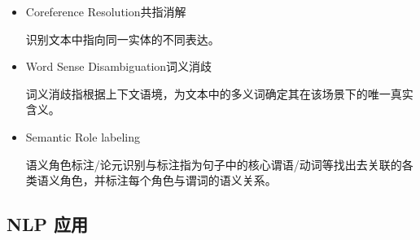 \documentclass[UTF8]{ctexart}
\begin{document}
\begin{itemize}
    识别文本中的实体，并将其分类到预定义的类别中。

    识别非结构化的文本中的关键信息来提供上下文和结构。


    \item Coreference Resolution共指消解
    
    识别文本中指向同一实体的不同表达。

    \item Word Sense Disambiguation词义消歧
    
    词义消歧指根据上下文语境，为文本中的多义词确定其在该场景下的唯一真实含义。

    \item Semantic Role labeling
    
    语义角色标注/论元识别与标注指为句子中的核心谓语/动词等找出去关联的各类语义角色，并标注每个角色与谓词的语义关系。
\end{itemize}

\subsection{NLP 应用}
\end{document}
